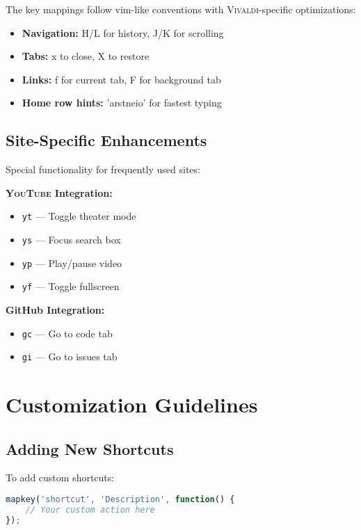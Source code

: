 \documentclass[11pt,a4paper,oneside]{book}
\newcommand{\vivaldi}{\textsc{Vivaldi}}
\newcommand{\youtube}{\textsc{YouTube}}
\newcommand{\keystroke}[1]{\texttt{\color{primaryblue}#1}}
\begin{document}
The key mappings follow vim-like conventions with \vivaldi{}-specific optimizations:

\begin{itemize}
    \item \textbf{Navigation:} H/L for history, J/K for scrolling
    \item \textbf{Tabs:} x to close, X to restore
    \item \textbf{Links:} f for current tab, F for background tab
    \item \textbf{Home row hints:} 'arstneio' for fastest typing
\end{itemize}

\subsection{Site-Specific Enhancements}

Special functionality for frequently used sites:

\textbf{\youtube{} Integration:}
\begin{itemize}
    \item \keystroke{yt} — Toggle theater mode
    \item \keystroke{ys} — Focus search box
    \item \keystroke{yp} — Play/pause video
    \item \keystroke{yf} — Toggle fullscreen
\end{itemize}

\textbf{GitHub Integration:}
\begin{itemize}
    \item \keystroke{gc} — Go to code tab
    \item \keystroke{gi} — Go to issues tab
\end{itemize}

\section{Customization Guidelines}

\subsection{Adding New Shortcuts}

To add custom shortcuts:

\begin{codebox}
\begin{lstlisting}[language=JavaScript]
mapkey('shortcut', 'Description', function() {
    // Your custom action here
});
\end{lstlisting}
\end{codebox}
\end{document}
